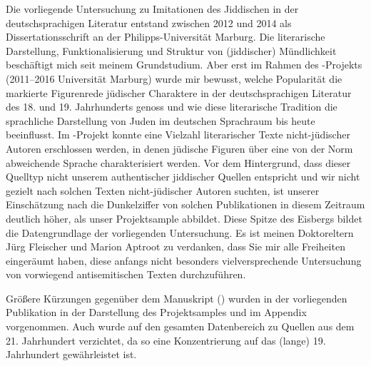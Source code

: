 

\noindent Die vorliegende Untersuchung zu Imitationen des Jiddischen in der deutschsprachigen Literatur entstand zwischen 2012 und 2014 als Dissertationsschrift an der Philipps-Universität Marburg. Die literarische Darstellung, Funktionalisierung und Struktur von (jiddischer) Mündlichkeit beschäftigt mich seit meinem Grundstudium. Aber erst im Rahmen des -Projekts  (2011--2016 Universität Marburg) wurde mir bewusst, welche Popularität die markierte Figurenrede jüdischer Charaktere in der deutschsprachigen Literatur des 18. und 19. Jahrhunderts genoss und wie diese literarische Tradition die sprachliche Darstellung von Juden im deutschen Sprachraum bis heute beeinflusst. Im -Projekt konnte eine Vielzahl literarischer Texte nicht-jüdischer Autoren erschlossen werden, in denen jüdische Figuren über eine von der Norm abweichende Sprache charakterisiert werden. Vor dem Hintergrund, dass dieser Quelltyp nicht unserem  authentischer jiddischer Quellen entspricht und wir nicht gezielt nach solchen Texten nicht-jüdischer Autoren suchten, ist unserer Einschätzung nach die Dunkelziffer von solchen Publikationen in diesem Zeitraum deutlich höher, als unser Projektsample abbildet. Diese Spitze des Eisbergs bildet die Datengrundlage der vorliegenden Untersuchung. 
Es ist meinen Doktoreltern Jürg Fleischer und Marion Aptroot zu verdanken, dass Sie mir alle Freiheiten eingeräumt haben, diese anfangs nicht besonders vielversprechende Untersuchung von vorwiegend antisemitischen Texten durchzuführen. 

Größere Kürzungen gegenüber dem Manuskript (\citealt{SchaeferDiss}) 
wurden in der vorliegenden Publikation in der Darstellung des Projektsamples und im Appendix vorgenommen. Auch wurde auf den gesamten Datenbereich zu Quellen aus dem 21. Jahrhundert  verzichtet, da so eine Konzentrierung auf das (lange) 19. Jahrhundert gewährleistet ist. 

